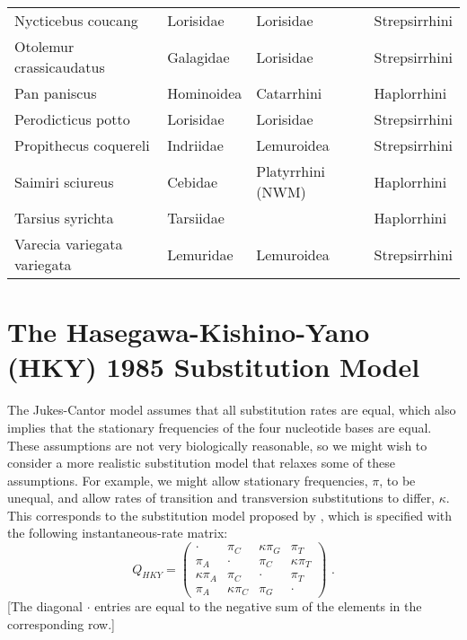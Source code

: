 \begin{table}[h!]
\begin{tabular}{l l l l}
Nycticebus coucang & Lorisidae & Lorisidae & Strepsirrhini \\
Otolemur crassicaudatus & Galagidae & Lorisidae & Strepsirrhini \\
Pan paniscus & Hominoidea & Catarrhini & Haplorrhini \\
Perodicticus potto & Lorisidae & Lorisidae & Strepsirrhini \\
Propithecus coquereli & Indriidae & Lemuroidea & Strepsirrhini \\
Saimiri sciureus & Cebidae & Platyrrhini (NWM) & Haplorrhini \\
Tarsius syrichta & Tarsiidae &  & Haplorrhini \\
Varecia variegata variegata & Lemuridae & Lemuroidea & Strepsirrhini \\
\hline
\end{tabular}
\label{tab:primates}
\end{table}




\newpage
\section{The Hasegawa-Kishino-Yano (HKY) 1985 Substitution Model}

The Jukes-Cantor model assumes that all substitution rates are equal, which also implies that the stationary frequencies of the four nucleotide bases are equal.
These assumptions are not very biologically reasonable, so we might wish to consider a more realistic substitution model that relaxes some of these assumptions.
For example, we might allow stationary frequencies, $\pi$, to be unequal, and allow rates of transition and transversion substitutions to differ, $\kappa$.
This corresponds to the substitution model proposed by \citet[][HKY]{Hasegawa1985}, which is specified with the following instantaneous-rate matrix: 
\begin{equation*}
Q_{HKY} = \begin{pmatrix} 
{\cdot} 			& {\pi_C} 	& {\kappa\pi_G} 			& {\pi_T} \\ 
{\pi_A} 		& {\cdot} 			& {\pi_C} 			& {\kappa\pi_T} \\ 
{\kappa\pi_A} 			& {\pi_C} 			& {\cdot} 			& {\pi_T} \\ 
{\pi_A} 			& {\kappa\pi_C} 			& {\pi_G} 	& {\cdot}  
\end{pmatrix} \mbox{  .}
\end{equation*}
[The diagonal ${\cdot}$ entries are equal to the negative sum of the elements in the corresponding row.] 


